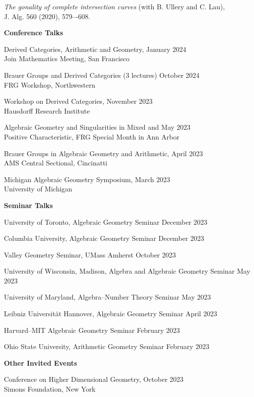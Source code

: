 \documentclass[11 pt]{letter}
\begin{document}
	\emph{The gonality of complete intersection curves} (with B. Ullery and C. Lau), \\
	\indent J. Alg. 560 (2020), 579–-608.


	\medskip
	\noindent
	\textbf{\large{Conference Talks}}


	Derived Categories, Arithmetic and Geometry, \hfill January 2024 \\
	\indent Join Mathematics Meeting, San Francisco

	Brauer Groups and Derived Categories (3 lectures) \hfill October 2024 \\
	\indent FRG Workshop, Northwestern

	
	Workshop on Derived Categories, \hfill November 2023 \\
	\indent Hausdorff Research Institute

	Algebraic Geometry and Singularities in Mixed and \hfill May 2023 \\
	\indent Positive Characteristic, FRG Special Month in Ann Arbor 


	Brauer Groups in Algebraic Geometry and Arithmetic, \hfill April 2023 \\
	\indent AMS Central Sectional, Cincinatti 


	Michigan Algebraic Geometry Symposium, \hfill March 2023 \\
	\indent University of Michigan


	\medskip
	\noindent
	\textbf{\large{Seminar Talks}}

	University of Toronto, Algebraic Geometry Seminar \hfill December 2023

	Columbia University, Algebraic Geometry Seminar \hfill December 2023

	Valley Geometry Seminar, UMass Amherst \hfill October 2023

	University of Wisconsin, Madison, Algebra and Algebraic Geometry Seminar \hfill May 2023

	University of Maryland, Algebra--Number Theory Seminar \hfill May 2023

	Leibniz Universit\"at Hannover, Algebraic Geometry Seminar \hfill April 2023

	Harvard--MIT Algebraic Geometry Seminar \hfill February 2023

	Ohio State University, Arithmetic Geometry Seminar \hfill February 2023



	\medskip
	\noindent
	\textbf{Other Invited Events}

	Conference on Higher Dimensional Geometry, \hfill October 2023 \\
	\indent Simons Foundation, New York
\end{document}
